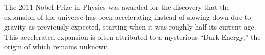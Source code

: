 \documentclass[oneside,11pt]{amsart}
\begin{document}

The 2011 Nobel Prize in Physics was awarded for the discovery that the expansion of the universe has been accelerating instead of slowing down due to gravity as previously expected, starting when it was roughly half its current age.  This accelerated expansion is often attributed to a mysterious ``Dark Energy,'' the origin of which remains unknown.
\end{document}
